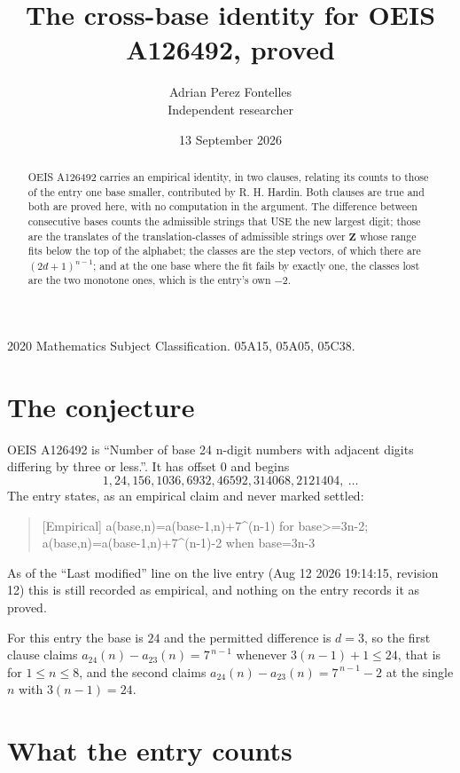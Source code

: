 \documentclass[11pt,a4paper]{article}
\title{The cross-base identity for OEIS A126492, proved}
\author{Adrian Perez Fontelles\\ \small Independent researcher}
\date{13 September 2026}
\theoremstyle{plain}
\theoremstyle{definition}
\begin{document}
\maketitle

\begin{abstract}
OEIS A126492 carries an empirical identity, in two clauses, relating its counts to those of the
entry one base smaller, contributed by R. H. Hardin. Both clauses are true and both are proved
here, with no computation in the argument. The difference between consecutive bases counts the
admissible strings that USE the new largest digit; those are the translates of the
translation-classes of admissible strings over $\mathbf{Z}$ whose range fits below the top of
the alphabet; the classes are the step vectors, of which there are $(2d+1)^{n-1}$; and at the
one base where the fit fails by exactly one, the classes lost are the two monotone ones, which
is the entry's own $-2$.
\end{abstract}

\noindent\small 2020 Mathematics Subject Classification. 05A15, 05A05, 05C38.\normalsize

\section{The conjecture}

OEIS A126492 is ``Number of base 24 n-digit numbers with adjacent digits differing by three or less.''. It has offset $0$ and begins
\[
1, 24, 156, 1036, 6932, 46592, 314068, 2121404,\ \dots
\]
The entry states, as an empirical claim and never marked settled:
\begin{quote}
[Empirical] a(base,n)=a(base-1,n)+7\textasciicircum{}(n-1) for base>=3n-2; a(base,n)=a(base-1,n)+7\textasciicircum{}(n-1)-2 when base=3n-3
\end{quote}
As of the ``Last modified'' line on the live entry (Aug 12 2026 19:14:15, revision 12)
this is still recorded as empirical, and nothing on the entry records it as proved.

For this entry the base is $24$ and the permitted difference is $d=3$, so the first clause
claims $a_{24}(n)-a_{23}(n)=7^{\,n-1}$ whenever $3(n-1)+1\le24$, that is for
$1\le n\le8$, and the second claims $a_{24}(n)-a_{23}(n)=7^{\,n-1}-2$ at the single
$n$ with $3(n-1)=24$.

\section{What the entry counts}
\end{document}
